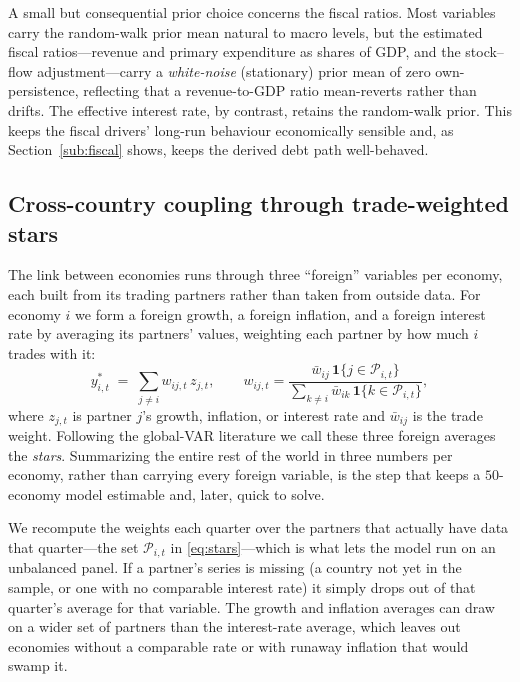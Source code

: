 \documentclass[11pt]{article}
\begin{document}
A small but consequential prior choice concerns the fiscal ratios. Most variables carry the random-walk
prior mean natural to macro levels, but the estimated fiscal ratios---revenue and primary expenditure as
shares of GDP, and the stock--flow adjustment---carry a \emph{white-noise} (stationary) prior mean of
zero own-persistence, reflecting that a revenue-to-GDP ratio mean-reverts rather than drifts. The
effective interest rate, by contrast, retains the random-walk prior. This keeps the fiscal drivers'
long-run behaviour economically sensible and, as Section~\ref{sub:fiscal} shows, keeps the derived debt
path well-behaved.

\subsection{Cross-country coupling through trade-weighted stars}
\label{sub:stars}

The link between economies runs through three ``foreign'' variables per economy, each built from its
trading partners rather than taken from outside data. For economy $i$ we form a foreign growth, a foreign
inflation, and a foreign interest rate by averaging its partners' values, weighting each partner by how
much $i$ trades with it:
\begin{equation}
  y^{*}_{i,t}\;=\;\sum_{j\neq i} w_{ij,t}\, z_{j,t},
  \qquad
  w_{ij,t} = \frac{\bar w_{ij}\,\mathbf{1}\{j \in \mathcal{P}_{i,t}\}}{\sum_{k\neq i}\bar w_{ik}\,\mathbf{1}\{k\in\mathcal{P}_{i,t}\}},
  \label{eq:stars}
\end{equation}
where $z_{j,t}$ is partner $j$'s growth, inflation, or interest rate and $\bar w_{ij}$ is the trade
weight. Following the global-VAR literature we call these three foreign averages the \emph{stars}.
Summarizing the entire rest of the world in three numbers per economy, rather than carrying every foreign
variable, is the step that keeps a $50$-economy model estimable and, later, quick to solve.

We recompute the weights each quarter over the partners that actually have data that quarter---the set
$\mathcal{P}_{i,t}$ in \eqref{eq:stars}---which is what lets the model run on an unbalanced panel. If a
partner's series is missing (a country not yet in the sample, or one with no comparable interest rate) it
simply drops out of that quarter's average for that variable. The growth and inflation averages can draw
on a wider set of partners than the interest-rate average, which leaves out economies without a
comparable rate or with runaway inflation that would swamp it.
\end{document}
